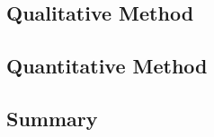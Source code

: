 \subsection{Qualitative Method}


\subsection{Quantitative Method}
\label{section:3.2}


\subsection{Summary}

